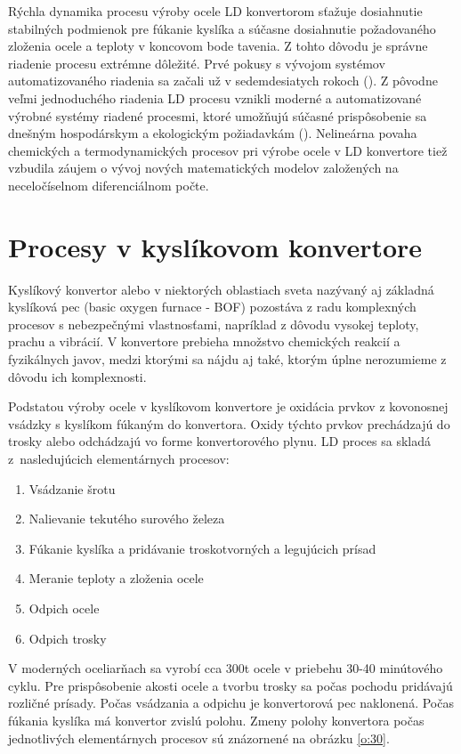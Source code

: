 \documentclass[]{tukediphc}
\begin{document}
Rýchla dynamika procesu výroby ocele LD konvertorom sťažuje dosiahnutie stabilných podmienok pre fúkanie kyslíka a súčasne dosiahnutie požadovaného zloženia ocele a teploty v koncovom bode tavenia. Z tohto dôvodu je správne riadenie procesu extrémne dôležité. Prvé pokusy s vývojom systémov automatizovaného riadenia sa začali už v sedemdesiatych rokoch (\cite{Fritz2005}). Z pôvodne veľmi jednoduchého riadenia LD procesu vznikli moderné a automatizované výrobné systémy riadené procesmi, ktoré umožňujú súčasné prispôsobenie sa dnešným hospodárskym a ekologickým požiadavkám (\cite{Sarkar2015}). Nelineárna povaha chemických a termodynamických procesov pri výrobe ocele v LD konvertore tiež vzbudila záujem o vývoj nových matematických modelov založených na neceločíselnom diferenciálnom počte.

\section{Procesy v kyslíkovom konvertore}

Kyslíkový konvertor alebo v niektorých oblastiach sveta nazývaný aj základná kyslíková pec (basic oxygen furnace - BOF) pozostáva z radu komplexných procesov s nebezpečnými vlastnosťami, napríklad z dôvodu vysokej teploty, prachu a vibrácií. V konvertore prebieha  množstvo chemických reakcií a fyzikálnych javov, medzi ktorými sa nájdu aj také, ktorým úplne nerozumieme z dôvodu ich komplexnosti.

Podstatou výroby ocele v kyslíkovom konvertore je oxidácia prvkov z kovonosnej vsádzky s kyslíkom fúkaným do konvertora. Oxidy týchto prvkov prechádzajú do trosky alebo odchádzajú vo forme konvertorového plynu. LD proces sa skladá z~nasledujúcich elementárnych procesov:

\begin{enumerate}
	\item Vsádzanie šrotu
	\item Nalievanie tekutého surového železa
	\item Fúkanie kyslíka a pridávanie troskotvorných a legujúcich prísad
	\item Meranie teploty a zloženia ocele
	\item Odpich ocele
	\item Odpich trosky
\end{enumerate}

V moderných oceliarňach sa vyrobí cca 300t ocele v priebehu 30-40 minútového cyklu. Pre prispôsobenie akosti ocele a tvorbu trosky sa počas pochodu pridávajú rozličné prísady. Počas vsádzania a odpichu je konvertorová pec naklonená. Počas fúkania kyslíka má konvertor zvislú polohu. Zmeny polohy konvertora počas jednotlivých elementárnych procesov sú znázornené na obrázku \ref{o:30}.
\end{document}
